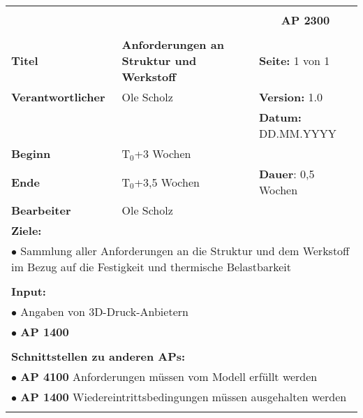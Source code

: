 \clearpage
\begin{table}[!h]
	\begin{center}
		\begin{tabular}{|p{35mm}||p{55mm}|p{50mm}||p{40mm}|}
			\hline
			\multicolumn{3}{|l||}{\textbf{}} & \multicolumn{1}{c|}{}\\
			\multicolumn{3}{|l||}{\textbf{}} & \multicolumn{1}{c|}{\textbf{AP 2300}}\\
			\multicolumn{3}{|l||}{\textbf{}} & \multicolumn{1}{c|}{}\\
			\hline\hline
			\textbf{Titel} & \multicolumn{2}{p{7cm}||}{\textbf{Anforderungen an Struktur und Werkstoff}} 
			& \textbf{Seite:} 1 von 1\\
			\hline
			\textbf{Verantwortlicher} & \multicolumn{2}{l||}{Ole Scholz} & \textbf{Version:} 1.0\\
			\hline
			\multicolumn{3}{|l||}{} & \textbf{Datum:} DD.MM.YYYY\\
			\hline\hline
			\textbf{Beginn} & \multicolumn{2}{l||}{T$_0$+3 Wochen} & \\
			\hline
			\textbf{Ende} & \multicolumn{2}{l||}{T$_0$+3,5 Wochen} & \textbf{Dauer}: 0,5 Wochen\\
			\hline\hline
			\textbf{Bearbeiter} & \multicolumn{3}{l|}{Ole Scholz}\\
			\hline\hline
			\multicolumn{4}{|p{150mm}|}{\textbf{Ziele:}}\\
			\multicolumn{4}{|p{150mm}|}{$\bullet$ Sammlung aller Anforderungen an die Struktur und dem Werkstoff im Bezug auf die Festigkeit und thermische Belastbarkeit}\\
			\multicolumn{4}{|p{150mm}|}{}\\
			\multicolumn{4}{|p{150mm}|}{\textbf{Input:}}\\
			\multicolumn{4}{|p{150mm}|}{$\bullet$ Angaben von 3D-Druck-Anbietern}\\
			\multicolumn{4}{|p{150mm}|}{$\bullet$ \textbf{AP 1400}}\\
			\multicolumn{4}{|p{150mm}|}{}\\
			\multicolumn{4}{|p{150mm}|}{\textbf{Schnittstellen zu anderen APs:}}\\
			\multicolumn{4}{|p{150mm}|}{$\bullet$ \textbf{AP 4100} Anforderungen müssen vom Modell erfüllt werden}\\
			\multicolumn{4}{|p{150mm}|}{$\bullet$ \textbf{AP 1400} Wiedereintrittsbedingungen müssen ausgehalten werden}\\
			\multicolumn{4}{|p{150mm}|}{}\\

\end{tabular}
\end{center}
\end{table}
